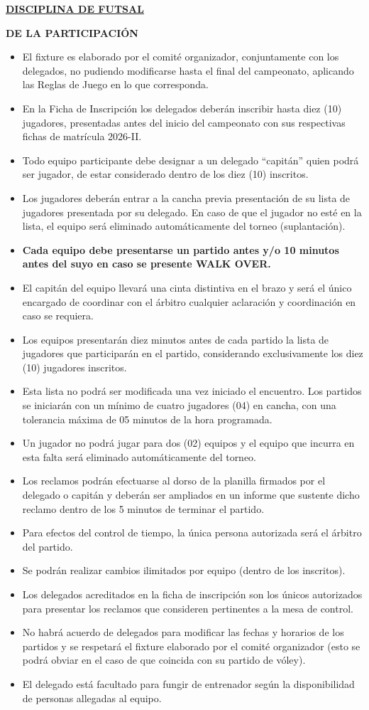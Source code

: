\documentclass[11pt,a4paper]{article}
\newcommand{\disciplina}[1]{\par\bigskip\begin{center}\textbf{\underline{#1}}\end{center}}
\begin{document}
\disciplina{DISCIPLINA DE FUTSAL}
\textbf{DE LA PARTICIPACIÓN}
\begin{itemize}
	\item El fixture es elaborado por el comité organizador, conjuntamente con los delegados, no pudiendo modificarse hasta el final del campeonato, aplicando las Reglas de Juego en lo que corresponda.
	\item En la Ficha de Inscripción los delegados deberán inscribir hasta diez (10) jugadores, presentadas antes del inicio del campeonato con sus respectivas fichas de matrícula 2026-II.
	\item Todo equipo participante debe designar a un delegado ``capitán'' quien podrá ser jugador, de estar considerado dentro de los diez (10) inscritos.
	\item Los jugadores deberán entrar a la cancha previa presentación de su lista de jugadores presentada por su delegado. En caso de que el jugador no esté en la lista, el equipo será eliminado automáticamente del torneo (suplantación).
	\item \textbf{Cada equipo debe presentarse un partido antes y/o 10 minutos antes del suyo en caso se presente WALK OVER.}
	\item El capitán del equipo llevará una cinta distintiva en el brazo y será el único encargado de coordinar con el árbitro cualquier aclaración y coordinación en caso se requiera.
	\item Los equipos presentarán diez minutos antes de cada partido la lista de jugadores que participarán en el partido, considerando exclusivamente los diez (10) jugadores inscritos.
	\item Esta lista no podrá ser modificada una vez iniciado el encuentro. Los partidos se iniciarán con un mínimo de cuatro jugadores (04) en cancha, con una tolerancia máxima de 05 minutos de la hora programada.
	\item Un jugador no podrá jugar para dos (02) equipos y el equipo que incurra en esta falta será eliminado automáticamente del torneo.
	\item Los reclamos podrán efectuarse al dorso de la planilla firmados por el delegado o capitán y deberán ser ampliados en un informe que sustente dicho reclamo dentro de los 5 minutos de terminar el partido.
	\item Para efectos del control de tiempo, la única persona autorizada será el árbitro del partido.
	\item Se podrán realizar cambios ilimitados por equipo (dentro de los inscritos).
	\item Los delegados acreditados en la ficha de inscripción son los únicos autorizados para presentar los reclamos que consideren pertinentes a la mesa de control.
	\item No habrá acuerdo de delegados para modificar las fechas y horarios de los partidos y se respetará el fixture elaborado por el comité organizador (esto se podrá obviar en el caso de que coincida con su partido de vóley).
	\item El delegado está facultado para fungir de entrenador según la disponibilidad de personas allegadas al equipo.
\end{itemize}
\end{document}
